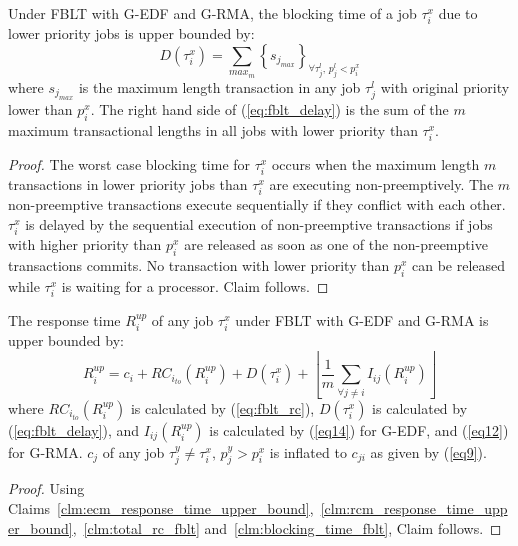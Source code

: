 %
\begin{clm}\label{clm:blocking_time_fblt}
%
Under FBLT with G-EDF and G-RMA, the blocking time of a job $\tau_{i}^{x}$ due to lower priority
jobs is upper bounded by: 
\begin{equation}
D(\tau_{i}^{x})=\sum_{max_{m}} \left\{s_{j_{max}}\right\}_{\forall\tau_{j}^{l},\, p_{j}^{l}<p_{i}^{x}}
\label{eq:fblt_delay}
\end{equation}
where $s_{j_{max}}$ is the maximum length transaction in any job
$\tau_{j}^{l}$ with original priority lower than $p_{i}^{x}$. The
right hand side of (\ref{eq:fblt_delay}) is the sum of the $m$
maximum transactional lengths in all jobs with lower priority than
$\tau_{i}^{x}$.
\end{clm}
%
\begin{proof}
%
The worst case blocking time for $\tau_{i}^{x}$ occurs when the maximum length $m$ transactions in lower priority jobs than $\tau_{i}^{x}$ are executing non-preemptively. The $m$ non-preemptive transactions execute sequentially if they conflict with each other. $\tau_i^x$ is delayed by the sequential execution of non-preemptive transactions if jobs with higher priority than $p_i^x$ are released as soon as one of the non-preemptive transactions commits. No transaction with lower priority than $p_i^x$ can be released while $\tau_i^x$ is waiting for a processor. Claim follows.
%
\end{proof}
%
\begin{clm}\label{clm:fblt_res_time}
The response time $R_i^{up}$ of any job $\tau_{i}^{x}$ under FBLT with G-EDF and G-RMA is upper bounded by:
%
\begin{equation}
R_{i}^{up}=c_{i}+RC_{i_{to}}(R_i^{up})+D(\tau_{i}^{x})+\left\lfloor \frac{1}{m}\sum_{\forall j\ne i}I_{ij}(R_{i}^{up})\right\rfloor
\label{eq:fblt_res_time}
\end{equation}
%
where $RC_{i_{to}}(R_i^{up})$ is calculated by (\ref{eq:fblt_rc}), $D(\tau_{i}^{x})$
is calculated by (\ref{eq:fblt_delay}), and $I_{ij}(R_{i}^{up})$
is calculated by (\ref{eq14}) for G-EDF, and (\ref{eq12}) for G-RMA. $c_{j}$ of any job $\tau_{j}^y\ne\tau_{i}^x,\, p_{j}^y>p_{i}^x$ is inflated to $c_{ji}$ as given by (\ref{eq9}).
\end{clm}
%
\begin{proof}
%
Using Claims~\ref{clm:ecm_response_time_upper_bound},~\ref{clm:rcm_response_time_upper_bound},~\ref{clm:total_rc_fblt} and~\ref{clm:blocking_time_fblt}, Claim follows.
%
\end{proof}
%
